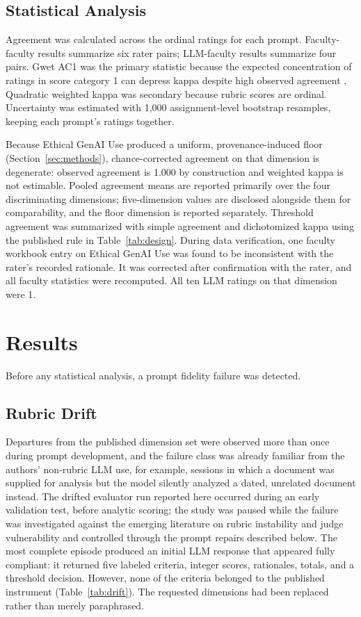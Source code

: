 \documentclass[sigconf]{acmart}
\begin{document}
\subsection{Statistical Analysis}
Agreement was calculated across the ordinal ratings for each prompt. Faculty-faculty results summarize six rater pairs; LLM-faculty results summarize four pairs. Gwet AC1 was the primary statistic because the expected concentration of ratings in score category 1 can depress kappa despite high observed agreement \cite{feinstein1990high,szafran2017miscalculation}. Quadratic weighted kappa was secondary because rubric scores are ordinal. Uncertainty was estimated with 1,000 assignment-level bootstrap resamples, keeping each prompt's ratings together.

Because Ethical GenAI Use produced a uniform, provenance-induced floor (Section~\ref{sec:methods}), chance-corrected agreement on that dimension is degenerate: observed agreement is 1.000 by construction and weighted kappa is not estimable. Pooled agreement means are reported primarily over the four discriminating dimensions; five-dimension values are disclosed alongside them for comparability, and the floor dimension is reported separately. Threshold agreement was summarized with simple agreement and dichotomized kappa using the published rule in Table~\ref{tab:design}. During data verification, one faculty workbook entry on Ethical GenAI Use was found to be inconsistent with the rater's recorded rationale. It was corrected after confirmation with the rater, and all faculty statistics were recomputed. All ten LLM ratings on that dimension were 1.
\label{sec:methods}

\section{Results}
Before any statistical analysis, a prompt fidelity failure was detected.

\subsection{Rubric Drift}
\label{sec:drift}
Departures from the published dimension set were observed more than once during prompt development, and the failure class was already familiar from the authors' non-rubric LLM use, for example, sessions in which a document was supplied for analysis but the model silently analyzed a dated, unrelated document instead. The drifted evaluator run reported here occurred during an early validation test, before analytic scoring; the study was paused while the failure was investigated against the emerging literature on rubric instability and judge vulnerability \cite{hong2026rubrics,thakur2025judging} and controlled through the prompt repairs described below. The most complete episode produced an initial LLM response that appeared fully compliant: it returned five labeled criteria, integer scores, rationales, totals, and a threshold decision. However, none of the criteria belonged to the published instrument (Table~\ref{tab:drift}). The requested dimensions had been replaced rather than merely paraphrased.
\end{document}
